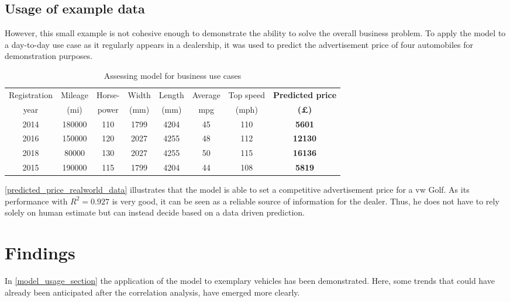 \subsection{Usage of example data}
However, this small example is not cohesive enough to demonstrate the ability to solve the overall business problem.
To apply the model to a day-to-day use case as it regularly appears in a dealership, it was used to predict the advertisement price
of four automobiles for demonstration purposes.
\begin{table}[H]
    \begin{adjustbox}{width={\textwidth}}
        \begin{tabular}{|c|c|c|c|c|c|c|c|}
            \hline
            Registration & Mileage & Horse- & Width & Length & Average & Top speed & \textbf{Predicted price} \\[-1ex]
            year         & (mi)    & power  & (mm)  & (mm)   & mpg     & (mph)     & \textbf{(£)}             \\ \hline
            2014         & 180000  & 110    & 1799  & 4204   & 45      & 110       & \textbf{5601}            \\\hline
            2016         & 150000  & 120    & 2027  & 4255   & 48      & 112       & \textbf{12130}           \\\hline
            2018         & 80000   & 130    & 2027  & 4255   & 50      & 115       & \textbf{16136}           \\\hline
            2015         & 190000  & 115    & 1799  & 4204   & 44      & 108       & \textbf{5819}            \\ \hline
        \end{tabular}
    \end{adjustbox}
    \caption{Assessing model for business use cases}
    \label{predicted_price_realworld_data}
\end{table}
\autoref{predicted_price_realworld_data} illustrates that the model is able to set a competitive advertisement price
for a \ac{vw} Golf. As its performance with $R^2 = 0.927$ is very good, it can be seen as a reliable source of information for the dealer.
Thus, he does not have to rely solely on human estimate but can instead decide based on a data driven prediction.
\section{Findings}
In \autoref{model_usage_section} the application of the model to exemplary vehicles has been demonstrated.
Here, some trends that could have already been anticipated after the correlation analysis, have emerged more clearly.
